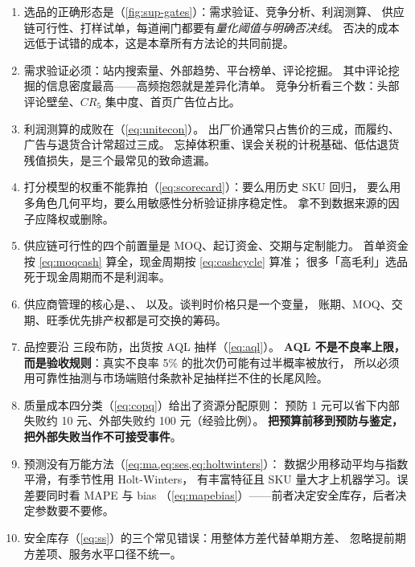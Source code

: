 \begin{keypoint}[本章要点回顾]
\begin{enumerate}
  \item 选品的正确形态是（\cref{fig:sup-gates}）：需求验证、竞争分析、利润测算、
        供应链可行性、打样试单，每道闸门都要有\emph{量化阈值与明确否决线}。
        否决的成本远低于试错的成本，这是本章所有方法论的共同前提。
  \item 需求验证必须：站内搜索量、外部趋势、平台榜单、评论挖掘。
        其中评论挖掘的信息密度最高——高频抱怨就是差异化清单。
        竞争分析看三个数：头部评论壁垒、$CR_5$ 集中度、首页广告位占比。
  \item 利润测算的成败在（\cref{eq:unitecon}）。
        出厂价通常只占售价的三成，而履约、广告与退货合计常超过三成。
        忘掉体积重、误会关税的计税基础、低估退货残值损失，是三个最常见的致命遗漏。
  \item 打分模型的权重不能靠拍（\cref{eq:scorecard}）：要么用历史 SKU 回归，
        要么用多角色几何平均，要么用敏感性分析验证排序稳定性。
        拿不到数据来源的因子应降权或删除。
  \item 供应链可行性的四个前置量是 MOQ、起订资金、交期与定制能力。
        首单资金按 \cref{eq:moqcash} 算全，现金周期按 \cref{eq:cashcycle} 算准；
        很多「高毛利」选品死于现金周期而不是利润率。
  \item 供应商管理的核心是、、
        以及。谈判时价格只是一个变量，
        账期、MOQ、交期、旺季优先排产权都是可交换的筹码。
  \item 品控要沿 三段布防，出货按 AQL 抽样（\cref{eq:aql}）。
        \textbf{AQL 不是不良率上限，而是验收规则}：真实不良率 5\% 的批次仍可能有过半概率被放行，
        所以必须用可靠性抽测与市场端赔付条款补足抽样拦不住的长尾风险。
  \item 质量成本四分类（\cref{eq:copq}）给出了资源分配原则：
        预防 1 元可以省下内部失败约 10 元、外部失败约 100 元（经验比例）。
        \textbf{把预算前移到预防与鉴定，把外部失败当作不可接受事件}。
  \item 预测没有万能方法（\cref{eq:ma,eq:ses,eq:holtwinters}）：
        数据少用移动平均与指数平滑，有季节性用 Holt-Winters，
        有丰富特征且 SKU 量大才上机器学习。误差要同时看 MAPE 与 bias
        （\cref{eq:mapebias}）——前者决定安全库存，后者决定参数要不要修。
  \item 安全库存（\cref{eq:ss}）的三个常见错误：用整体方差代替单期方差、
        忽略提前期方差项、服务水平口径不统一。

\end{enumerate}
\end{keypoint}
